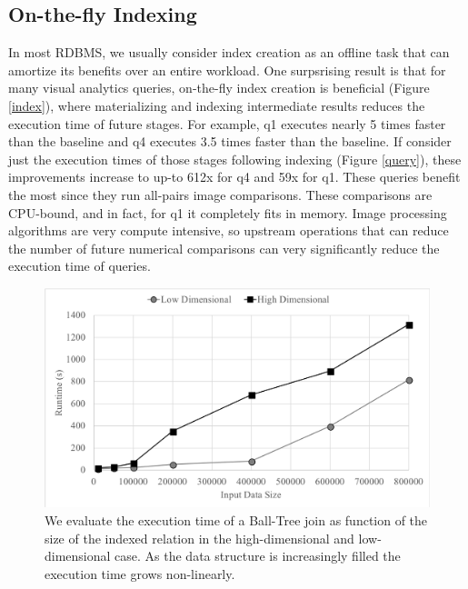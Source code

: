 \subsection{On-the-fly Indexing}
In most RDBMS, we usually consider index creation as an offline task that can amortize its benefits over an entire workload.
One surpsrising result is that for many visual analytics queries, on-the-fly index creation is beneficial (Figure \ref{index}), where materializing and indexing intermediate results reduces the execution time of future stages.
For example, q1 executes nearly 5 times faster than the baseline and q4 executes 3.5 times faster than the baseline.
If consider just the execution times of those stages following indexing (Figure \ref{query}), these improvements increase to up-to 612x for q4 and 59x for q1. 
These queries benefit the most since they run all-pairs image comparisons. 
These comparisons are CPU-bound, and in fact, for q1 it completely fits in memory.
Image processing algorithms are very compute intensive, so upstream operations that can reduce the number of future numerical comparisons can very significantly reduce the execution time of queries.

\begin{figure}[t]
\centering
 \includegraphics[width=\columnwidth]{figures/spatialjoin.png}
 \caption{We evaluate the execution time of a Ball-Tree join as function of the size of the indexed relation in the high-dimensional and low-dimensional case. As the data structure is increasingly filled the execution time grows non-linearly.  \label{join} }
\end{figure}

